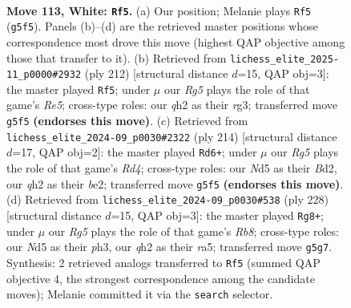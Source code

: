 \documentclass[11pt]{article}
\begin{document}
\clearpage

\begin{figure}[p]\centering
\begin{subfigure}{0.46\textwidth}\centering
\resizebox{\linewidth}{!}{%
\newchessgame
\chessboard[
  setfen={3B4/1k6/8/1K1N2R1/8/8/7q/8 w - - 2 113},
  showmover=false,
  pgfstyle=straightmove, color=movearrow, markmove={g5-f5}
]}
\caption{}
\end{subfigure}\hfill
\begin{subfigure}{0.46\textwidth}\centering
\resizebox{\linewidth}{!}{%
\newchessgame
\chessboard[
  setfen={8/5K2/5B1k/4R3/8/6r1/8/8 w - - 83 107},
  showmover=false,
  pgfstyle=straightmove, color=movearrow, markmove={e5-f5}
]}
\caption{}
\end{subfigure}
\\[4pt]
\begin{subfigure}{0.46\textwidth}\centering
\resizebox{\linewidth}{!}{%
\newchessgame
\chessboard[
  setfen={2r5/8/6k1/P3K3/3R4/8/3Bb3/8 w - - 65 108},
  showmover=false,
  pgfstyle=straightmove, color=movearrow, markmove={d4-d6}
]}
\caption{}
\end{subfigure}\hfill
\begin{subfigure}{0.46\textwidth}\centering
\resizebox{\linewidth}{!}{%
\newchessgame
\chessboard[
  setfen={1R6/8/8/r7/4K1k1/7p/7B/8 w - - 20 115},
  showmover=false,
  pgfstyle=straightmove, color=movearrow, markmove={b8-g8}
]}
\caption{}
\end{subfigure}
\caption{\textbf{Move 113, White: \texttt{Rf5}.} (a) Our position; Melanie plays \texttt{Rf5} (\texttt{g5f5}). Panels (b)--(d) are the retrieved master positions whose correspondence most drove this move (highest QAP objective among those that transfer to it). (b) Retrieved from \texttt{lichess\_elite\_2025-11\_p0000\#2932} (ply 212) [structural distance $d$=15, QAP obj=3]: the master played \texttt{Rf5}; under $\mu$ our \emph{Rg5} plays the role of that game's \emph{Re5}; cross-type roles: our \emph{q}h2 as their \emph{r}g3; transferred move \texttt{g5f5} \textbf{(endorses this move)}. (c) Retrieved from \texttt{lichess\_elite\_2024-09\_p0030\#2322} (ply 214) [structural distance $d$=17, QAP obj=2]: the master played \texttt{Rd6+}; under $\mu$ our \emph{Rg5} plays the role of that game's \emph{Rd4}; cross-type roles: our \emph{N}d5 as their \emph{B}d2, our \emph{q}h2 as their \emph{b}e2; transferred move \texttt{g5f5} \textbf{(endorses this move)}. (d) Retrieved from \texttt{lichess\_elite\_2024-09\_p0030\#538} (ply 228) [structural distance $d$=15, QAP obj=3]: the master played \texttt{Rg8+}; under $\mu$ our \emph{Rg5} plays the role of that game's \emph{Rb8}; cross-type roles: our \emph{N}d5 as their \emph{p}h3, our \emph{q}h2 as their \emph{r}a5; transferred move \texttt{g5g7}. Synthesis: 2 retrieved analogs transferred to \texttt{Rf5} (summed QAP objective 4, the strongest correspondence among the candidate moves); Melanie committed it via the \texttt{search} selector.}
\label{fig:thought-m224}
\end{figure}
\end{document}
